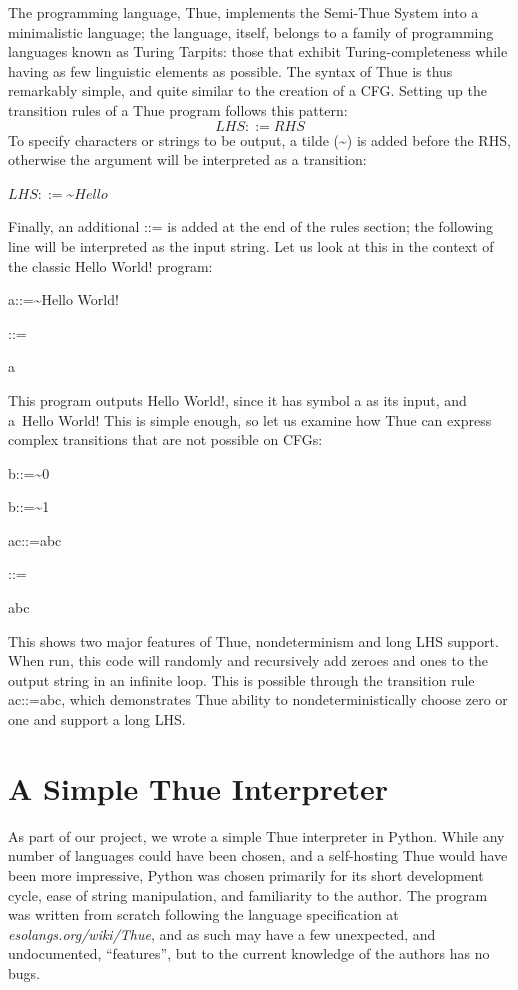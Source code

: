 \documentclass[12pt]{article}
\begin{document}
The programming language, Thue, implements the Semi-Thue System into a minimalistic language; the language, itself, belongs to a family of programming languages known as Turing Tarpits: those that exhibit Turing-completeness while having as few linguistic elements as possible.  The syntax of Thue is thus remarkably simple, and quite similar to the creation of a CFG.  Setting up the transition rules of a Thue program follows this pattern:
\[
LHS ::= RHS
\]
To specify characters or strings to be output, a tilde (\textasciitilde) is added before the RHS, otherwise the argument will be interpreted as a transition:

$LHS ::= $\textasciitilde$ Hello$

Finally, an additional ::= is added at the end of the rules section; the following line will be interpreted as the input string. Let us look at this in the context of the classic Hello World! program:
\begin{center}
a::=\textasciitilde Hello World!

::=

a
\end{center}
This program outputs Hello World!, since it has symbol a as its input, and a~Hello World!  This is simple enough, so let us examine how Thue can express complex transitions that are not possible on CFGs:
\begin{center}
    b::=\textasciitilde 0

b::=\textasciitilde1

ac::=abc

::=

abc
\end{center}
This shows two major features of Thue, nondeterminism and long LHS support.  When run, this code will randomly and recursively add zeroes and ones to the output string in an infinite loop.  This is possible through the transition rule ac::=abc, which demonstrates Thue ability to nondeterministically choose zero or one and support a long LHS. 

\section{A Simple Thue Interpreter}
As part of our project, we wrote a simple Thue interpreter in Python. 
While any number of languages could have been chosen, and a self-hosting
Thue would have been more impressive, Python was chosen primarily for 
its short development cycle, ease of string manipulation, and familiarity 
to the author. The program was written from scratch following the 
language specification at \emph{esolangs.org/wiki/Thue}, and as such
may have a few unexpected, and undocumented, ``features'', but to the 
current knowledge of the authors has no bugs.
\end{document}
